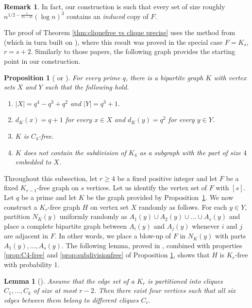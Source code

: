 \documentclass[11pt]{article}
\theoremstyle{plain}
\newtheorem{lemma}[theorem]{Lemma}
\newtheorem{proposition}[theorem]{Proposition}
\theoremstyle{definition}
\newtheorem{remark}[theorem]{Remark}
\begin{document}
\begin{remark}
    In fact, our construction is such that every set of size roughly $n^{1/2-\frac{1}{8s-10}}(\log n)^3$ contains an \emph{induced} copy of $F$.
\end{remark}

The proof of Theorem \ref{thm:cliquefree vs clique precise} uses the method from \cite{Janzer_Sudakov} (which in turn built on \cite{Mattheus_Verstraete}), where this result was proved in the special case $F=K_s$, $r=s+2$. Similarly to those papers, the following graph provides the starting point in our construction.

\begin{proposition}[\cite{ONan72} or \cite{Mattheus_Verstraete}] \label{prop:algebraic graph}
    For every prime $q$, there is a bipartite graph $K$ with vertex sets $X$ and $Y$ such that the following hold.
    \begin{enumerate}
        \item $|X|=q^4-q^3+q^2$ and $|Y|=q^3+1$.
        \item $d_K(x)=q+1$ for every $x\in X$ and $d_K(y)=q^2$ for every $y\in Y$.
        \item $K$ is $C_4$-free. \label{prop:C4-free}
        \item $K$ does not contain the subdivision of $K_4$ as a subgraph with the part of size $4$ embedded to $X$. \label{prop:subdivisionfree}
    \end{enumerate}
\end{proposition}

Throughout this subsection, let $r\geq 4$ be a fixed positive integer and let $F$ be a fixed $K_{r-1}$-free graph on $s$ vertices. Let us identify the vertex set of $F$ with $[s]$. Let $q$ be a prime and let $K$ be the graph provided by Proposition~\ref{prop:algebraic graph}. We now construct a $K_r$-free graph $H$ on vertex set $X$ randomly as follows. 
For each $y\in Y$, partition $N_K(y)$ uniformly randomly as $A_1(y)\cup A_2(y)\cup \dots \cup A_s(y)$ and place a complete bipartite graph between $A_i(y)$ and $A_j(y)$ whenever $i$ and $j$ are adjacent in $F$. In other words, we place a blow-up of $F$ in $N_K(y)$ with parts $A_1(y),\dots,A_s(y)$. The following lemma, proved in \cite{Janzer_Sudakov}, combined with properties \ref{prop:C4-free} and \ref{prop:subdivisionfree} of Proposition \ref{prop:algebraic graph}, shows that $H$ is $K_r$-free with probability 1.

\begin{lemma}[{\cite[Lemma 2.2]{Janzer_Sudakov}}] \label{lem:clique partition}
    Assume that the edge set of a $K_r$ is partitioned into cliques $C_1,\dots,C_k$ of size at most $r-2$. Then there exist four vertices such that all six edges between them belong to different cliques $C_i$.
\end{lemma}
\end{document}
